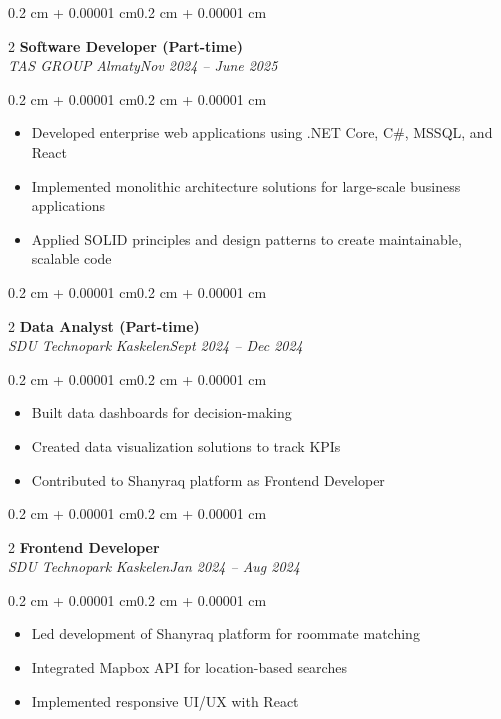 \documentclass[10pt, letterpaper]{article}
\newenvironment{highlights}{\begin{itemize}[topsep=0.10 cm,parsep=0.10 cm,partopsep=0pt,itemsep=0pt,leftmargin=0.4 cm + 10pt]}{\end{itemize}}
\newenvironment{onecolentry}{\begin{adjustwidth}{0.2 cm + 0.00001 cm}{0.2 cm + 0.00001 cm}}{\end{adjustwidth}}
\newenvironment{twocolentry}[2][]{\onecolentry\def\secondColumn{#2}\setcolumnwidth{\fill, 4.5 cm}\begin{paracol}{2}}{\switchcolumn \raggedleft \secondColumn\end{paracol}\endonecolentry}
\begin{document}
\vspace{0.2 cm}
\begin{twocolentry}{\textit{Almaty}\newline\textit{Nov 2024 – June 2025}}
\textbf{Software Developer (Part-time)}\\
\textit{TAS GROUP}
\end{twocolentry}
\vspace{0.10 cm}
\begin{onecolentry}
\begin{highlights}
    \item Developed enterprise web applications using .NET Core, C\#, MSSQL, and React
    \item Implemented monolithic architecture solutions for large-scale business applications
    \item Applied SOLID principles and design patterns to create maintainable, scalable code
\end{highlights}
\end{onecolentry}

\vspace{0.2 cm}
\begin{twocolentry}{\textit{Kaskelen}\newline\textit{Sept 2024 – Dec 2024}}
\textbf{Data Analyst (Part-time)}\\
\textit{SDU Technopark}
\end{twocolentry}
\vspace{0.10 cm}
\begin{onecolentry}
\begin{highlights}
    \item Built data dashboards for decision-making
    \item Created data visualization solutions to track KPIs
    \item Contributed to Shanyraq platform as Frontend Developer
\end{highlights}
\end{onecolentry}

\vspace{0.2 cm}
\vspace{0.2 cm}
\begin{twocolentry}{\textit{Kaskelen}\newline\textit{Jan 2024 – Aug 2024}}
\textbf{Frontend Developer}\\
\textit{SDU Technopark}
\end{twocolentry}
\vspace{0.10 cm}
\begin{onecolentry}
\begin{highlights}
    \item Led development of Shanyraq platform for roommate matching
    \item Integrated Mapbox API for location-based searches
    \item Implemented responsive UI/UX with React
\end{highlights}
\end{onecolentry}
\end{document}
